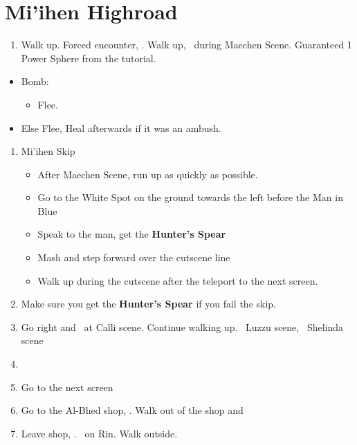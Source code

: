 \chapter{Mi'ihen Highroad}

\begin{enumerate}
	\item Walk up. Forced encounter, \sd. Walk up, \sd\ during Maechen Scene. Guaranteed 1 Power Sphere from the tutorial.
\end{enumerate}
\begin{encounters}
	\begin{itemize}
		\item Bomb:
		      \begin{itemize}
			      \kimahrif Lancet Bomb, learn \textbf{Self Destruct}
			      \item Flee.
		      \end{itemize}
		\item Else Flee,  Heal afterwards if it was an ambush.
	\end{itemize}
\end{encounters}
\begin{enumerate}[resume]
	\item {Mi'ihen Skip}
	      \begin{itemize}
		      \item After Maechen Scene, run up as quickly as possible.
		      \item Go to the White Spot on the ground towards the left before the Man in Blue
		      \item Speak to the man, get the \textbf{Hunter's Spear}
		      \item Mash and step forward over the cutscene line
		      \item Walk up during the cutscene after the teleport to the next screen.
	      \end{itemize}
	\item Make sure you get the \textbf{Hunter's Spear} if you fail the skip.
	\item Go right and \sd\ at Calli scene. Continue walking up. \sd\ Luzzu scene, \sd\ Shelinda scene
	\item \formation{\tidus}{\wakka}{\kimahri}
	\item Go to the next screen
	\item Go to the Al-Bhed shop, \sd. Walk out of the shop and \cs[5:30]
	\item Leave shop, \sd. \sd\ on Rin. Walk outside.
\end{enumerate}
